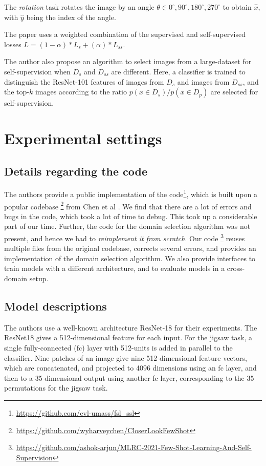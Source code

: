 The \textit{rotation} task rotates the image by an angle $\theta \in {0^{\circ}, 90^{\circ}, 180^{\circ}, 270^{\circ}}$ to obtain $\hat{x}$, with $\hat{y}$ being the index of the angle.

The paper uses a weighted combination of the supervised and self-supervised losses $L = (1-\alpha)*L_s + (\alpha)*L_{ss}$. 

The author also propose an algorithm to select images from a large-dataset for self-supervision when $D_s$ and $D_{ss}$ are different. Here, a classifier is trained to distinguish the ResNet-101 features of images from $D_s$ and images from $D_{ss}$, and the top-$k$ images according to the ratio $p(x \in D_s) / p(x \in D_p)$ are selected for self-supervision. 

\section{Experimental settings}

\subsection{Details regarding the code}

The authors provide a public implementation of the code\footnote[1]{\url{https://github.com/cvl-umass/fsl\_ssl}}, which is built upon a popular codebase \footnote[2]{\url{https://github.com/wyharveychen/CloserLookFewShot}} from Chen et al \cite{chen2018a}. We find that there are a lot of errors and bugs in the code, which took a lot of time to debug. This took up a considerable part of  our time. Further, the code for the domain selection algorithm was not present, and hence we had to \textit{reimplement it from scratch}. Our code \footnote[3]{\url{https://github.com/ashok-arjun/MLRC-2021-Few-Shot-Learning-And-Self-Supervision}} reuses multiple files from the original codebase, corrects several errors, and provides an implementation of the domain selection algorithm. We also provide interfaces to train models with a different architecture, and to evaluate models in a cross-domain setup.

\subsection{Model descriptions}

The authors use a well-known architecture ResNet-18 for their experiments. The ResNet18 gives a 512-dimensional feature for each input. For the jigsaw task, a single fully-connected (fc) layer with 512-units is added in parallel to the classifier. Nine patches of an image give nine 512-dimensional feature vectors, which are concatenated, and projected to 4096 dimensions using an fc layer, and then to a 35-dimensional output using another fc layer, corresponding to the 35 permutations for the jigsaw task. 

